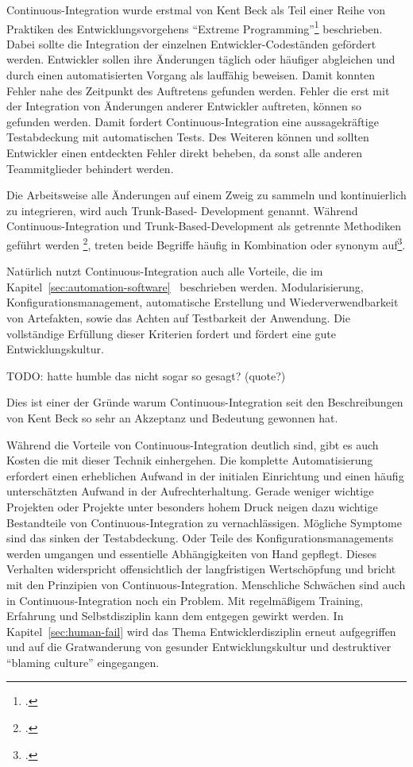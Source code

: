 Continuous-Integration wurde erstmal von Kent Beck als Teil einer Reihe von Praktiken des Entwicklungsvorgehens ``Extreme 
Programming''\footcite{kent1999} beschrieben. Dabei sollte die Integration der einzelnen Entwickler-Codeständen gefördert 
werden. Entwickler sollen ihre Änderungen täglich oder häufiger abgleichen und durch einen automatisierten Vorgang als 
lauffähig beweisen. Damit konnten Fehler nahe des Zeitpunkt des Auftretens gefunden werden. Fehler die erst mit der 
Integration von Änderungen anderer Entwickler auftreten, können so gefunden werden. Damit fordert Continuous-Integration  
eine aussagekräftige Testabdeckung mit automatischen Tests. Des Weiteren können und sollten Entwickler einen entdeckten 
Fehler direkt beheben, da sonst alle anderen Teammitglieder behindert werden.

Die Arbeitsweise alle Änderungen auf einem Zweig zu sammeln und kontinuierlich zu integrieren, wird auch Trunk-Based-
Development genannt. Während Continuous-Integration und Trunk-Based-Development als getrennte Methodiken geführt werden
\footcite{trunkbaseddevelopment}, treten beide Begriffe häufig in Kombination oder synonym 
auf\footcite{fowler-feature-branch}.

Natürlich nutzt Continuous-Integration auch alle Vorteile, die im 
Kapitel~\ref{sec:automation-software}~ beschrieben werden. Modularisierung, 
Konfigurationsmanagement, automatische Erstellung und Wiederverwendbarkeit von Artefakten, sowie das Achten auf 
Testbarkeit der Anwendung. Die vollständige Erfüllung dieser Kriterien fordert und fördert eine gute Entwicklungskultur.

TODO: hatte humble das nicht sogar so gesagt? (quote?)
 
Dies ist einer der Gründe warum Continuous-Integration seit den Beschreibungen 
von Kent Beck so sehr an Akzeptanz und Bedeutung gewonnen hat.

Während die Vorteile von Continuous-Integration deutlich sind, gibt es auch Kosten die mit dieser Technik einhergehen. 
Die komplette Automatisierung erfordert einen erheblichen Aufwand in der initialen Einrichtung und einen häufig 
unterschätzten Aufwand in der Aufrechterhaltung. Gerade weniger wichtige Projekten oder Projekte unter besonders hohem 
Druck neigen dazu wichtige Bestandteile von Continuous-Integration zu vernachlässigen. Mögliche Symptome sind das sinken 
der Testabdeckung. Oder Teile des Konfigurationsmanagements werden umgangen und essentielle Abhängigkeiten von Hand 
gepflegt. Dieses Verhalten widerspricht offensichtlich der langfristigen Wertschöpfung und bricht mit den Prinzipien von 
Continuous-Integration. Menschliche Schwächen sind auch in Continuous-Integration noch ein Problem. Mit regelmäßigem 
Training, Erfahrung und Selbstdisziplin kann dem entgegen gewirkt werden. In Kapitel~\ref{sec:human-fail} wird das Thema 
Entwicklerdisziplin erneut aufgegriffen und auf die Gratwanderung von gesunder Entwicklungskultur und destruktiver 
``blaming culture'' eingegangen.

